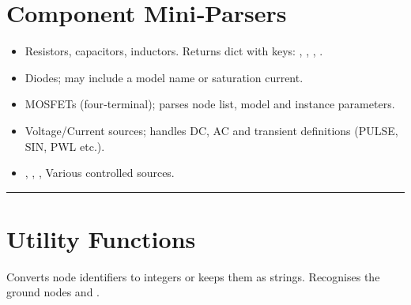 \documentclass[letterpaper,10pt,english]{sphinxmanual}
\begin{document}
\section{Component Mini‑Parsers}
\label{\detokenize{parser:component-miniparsers}}\begin{itemize}
\item {} 
\sphinxAtStartPar
{} \textendash{} Resistors, capacitors, inductors.
Returns dict with keys: , , , .

\item {} 
\sphinxAtStartPar
{} \textendash{} Diodes; may include a model name or saturation current.

\item {} 
\sphinxAtStartPar
{} \textendash{} MOSFETs (four‑terminal); parses node list, model and
instance parameters.

\item {} 
\sphinxAtStartPar
{} \textendash{} Voltage/Current sources; handles DC, AC and transient
definitions (PULSE, SIN, PWL etc.).

\item {} 
\sphinxAtStartPar
{}, , ,  \textendash{} Various
controlled sources.

\end{itemize}


\bigskip\hrule\bigskip



\section{Utility Functions}
\label{\detokenize{parser:utility-functions}}

\begin{fulllineitems}
\label{\detokenize{parser:NetlistParser._parse_node}}
\pysigstartsignatures
\pysiglinewithargsret
{}
{}
{}
\pysigstopsignatures
\sphinxAtStartPar
Converts node identifiers to integers or keeps them as strings.
Recognises the ground nodes  and .

\end{fulllineitems}
\end{document}
